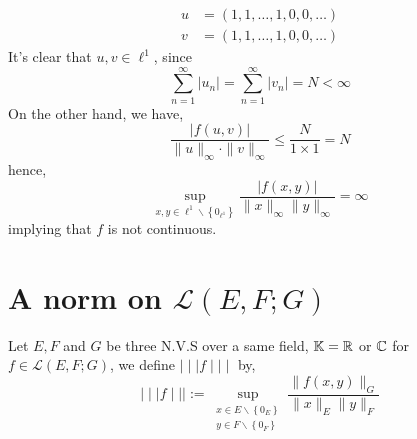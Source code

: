 \begin{enumerate}[(1)]
\begin{align*}
		u &= \left( 1, 1, \hdots , 1, 0, 0, \hdots  \right)  \\ 
		v &=  
		\left( 
			1, 1, \hdots , 1, 0, 0, \hdots 
		\right)
	\end{align*} 
	It's clear that $u,v \in \ell ^{1} $, since   
	\[
		\sum_{n=1}^{\infty} \left| u_{n} \right| = 
		\sum_{n=1}^{\infty} 
		\left| v_{n} \right| = N < \infty 
	\]
	On the other hand, we have, 
	\[ 
		\frac{
			\left| f(u,v)  \right|
		}{ \| u \| _{\infty } \cdot \| v \| _{\infty }} 
		\leq 
		\frac{N}{1 \times  1 } = N
	\]
	hence, 
	\[
	\sup_{x,y \in \ell ^{1} \backslash \left\{ 0_{\ell ^{1}} \right\}}  
	\frac{\left| f(x,y)  \right|}{\| x \| _{\infty }\| y \| _{\infty }} = \infty 
	\]
	implying that $f $ is not continuous.
\end{enumerate} 
\section{A norm on $\mathcal{L} (E,F;G)$} 
Let $E,F $ and $G $ be three N.V.S over a same field, 
$\mathbb{K} = \mathbb{R}  $ or $\mathbb{C}  $ for $f \in  \mathcal{L} (E,F;G)  $, 
we define $\mid \mid \mid  f \mid \mid \mid  $ by, 
\[
\mid \mid \mid  f \mid \mid \mid  :=
\sup_{
	\begin{gathered}  
x \in E \backslash \left\{ 0_{E} \right\}
		\\ 
	y \in  F \backslash \left\{ 0_{F} \right\}
	\end{gathered}}   
	\frac{\| f(x,y)  \| _{G}}{ \| x \| _{E} \| y \| _{F}}
\]

